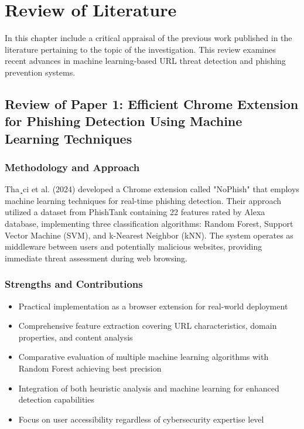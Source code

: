\chapter{Review of Literature}
In this chapter include a critical appraisal of the previous work published in the literature pertaining to the topic of the investigation. This review examines recent advances in machine learning-based URL threat detection and phishing prevention systems.

\section{Review of Paper 1: Efficient Chrome Extension for Phishing Detection Using Machine Learning Techniques} 

\subsection*{Methodology and Approach}
Tha¸ci et al. (2024) developed a Chrome extension called "NoPhish" that employs machine learning techniques for real-time phishing detection. Their approach utilized a dataset from PhishTank containing 22 features rated by Alexa database, implementing three classification algorithms: Random Forest, Support Vector Machine (SVM), and k-Nearest Neighbor (kNN). The system operates as middleware between users and potentially malicious websites, providing immediate threat assessment during web browsing.\cite{arxiv5}

\subsection*{Strengths and Contributions}
\begin{itemize}
	\item Practical implementation as a browser extension for real-world deployment
	\item Comprehensive feature extraction covering URL characteristics, domain properties, and content analysis
	\item Comparative evaluation of multiple machine learning algorithms with Random Forest achieving best precision
	\item Integration of both heuristic analysis and machine learning for enhanced detection capabilities
	\item Focus on user accessibility regardless of cybersecurity expertise level
\end{itemize}

